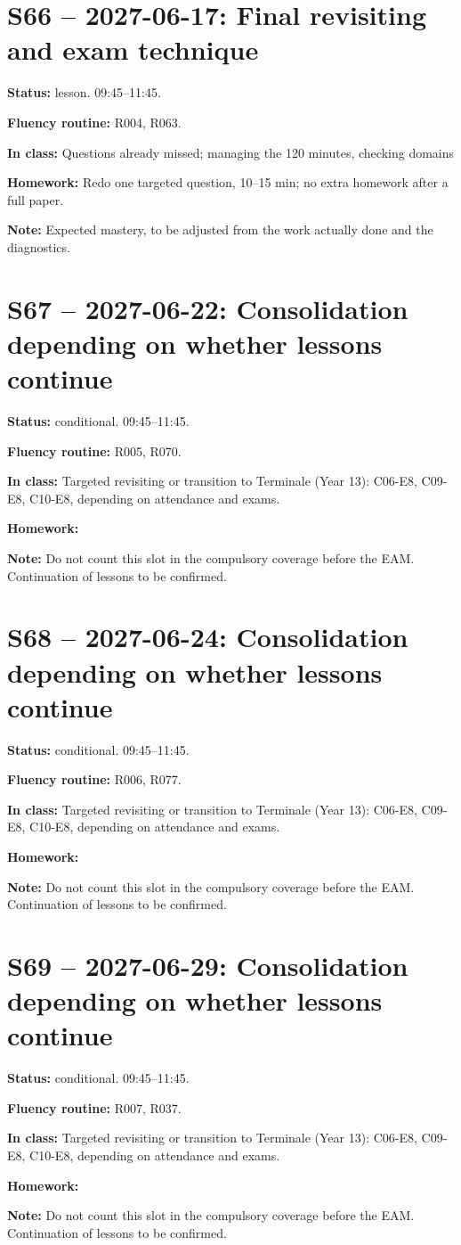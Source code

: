 \section*{S66 -- 2027-06-17: Final revisiting and exam technique}
\textbf{Status:} lesson. 09:45–11:45.\par\textbf{Fluency routine:} R004, R063.\par\textbf{In class:} Questions already missed; managing the 120 minutes, checking domains\par\textbf{Homework:} Redo one targeted question, 10–15 min; no extra homework after a full paper.\par\textbf{Note:} Expected mastery, to be adjusted from the work actually done and the diagnostics.
\section*{S67 -- 2027-06-22: Consolidation depending on whether lessons continue}
\textbf{Status:} conditional. 09:45–11:45.\par\textbf{Fluency routine:} R005, R070.\par\textbf{In class:} Targeted revisiting or transition to Terminale (Year 13): C06-E8, C09-E8, C10-E8, depending on attendance and exams.\par\textbf{Homework:} \par\textbf{Note:} Do not count this slot in the compulsory coverage before the EAM. Continuation of lessons to be confirmed.
\section*{S68 -- 2027-06-24: Consolidation depending on whether lessons continue}
\textbf{Status:} conditional. 09:45–11:45.\par\textbf{Fluency routine:} R006, R077.\par\textbf{In class:} Targeted revisiting or transition to Terminale (Year 13): C06-E8, C09-E8, C10-E8, depending on attendance and exams.\par\textbf{Homework:} \par\textbf{Note:} Do not count this slot in the compulsory coverage before the EAM. Continuation of lessons to be confirmed.
\section*{S69 -- 2027-06-29: Consolidation depending on whether lessons continue}
\textbf{Status:} conditional. 09:45–11:45.\par\textbf{Fluency routine:} R007, R037.\par\textbf{In class:} Targeted revisiting or transition to Terminale (Year 13): C06-E8, C09-E8, C10-E8, depending on attendance and exams.\par\textbf{Homework:} \par\textbf{Note:} Do not count this slot in the compulsory coverage before the EAM. Continuation of lessons to be confirmed.
